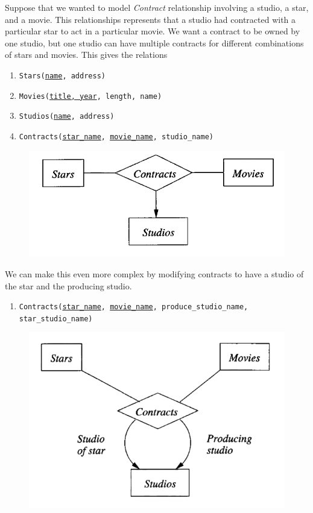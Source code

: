 \documentclass{article}
\begin{document}
      \begin{example}
        Suppose that we wanted to model \textit{Contract} relationship involving a studio, a star, and a movie. This relationships represents that a studio had contracted with a particular star to act in a particular movie. We want a contract to be owned by one studio, but one studio can have multiple contracts for different combinations of stars and movies. This gives the relations 
        \begin{enumerate}
          \item \texttt{Stars(\underline{name}, address)} 
          \item \texttt{Movies(\underline{title, year}, length, name)} 
          \item \texttt{Studios(\underline{name}, address)} 
          \item \texttt{Contracts(\underline{star\_name}, \underline{movie\_name}, studio\_name)}
        \end{enumerate}
        \begin{figure}[H]
          \centering 
          \includegraphics[scale=0.4]{img/contracts.png}
          \caption{} 
          \label{fig:contracts}
        \end{figure}
        We can make this even more complex by modifying contracts to have a studio of the star and the producing studio. 
        \begin{enumerate}
          \item \texttt{Contracts(\underline{star\_name}, \underline{movie\_name}, produce\_studio\_name, star\_studio\_name)}
        \end{enumerate}
        \begin{figure}[H]
          \centering 
          \includegraphics[scale=0.4]{img/four_ary.png}

\end{figure}
\end{example}
\end{document}
